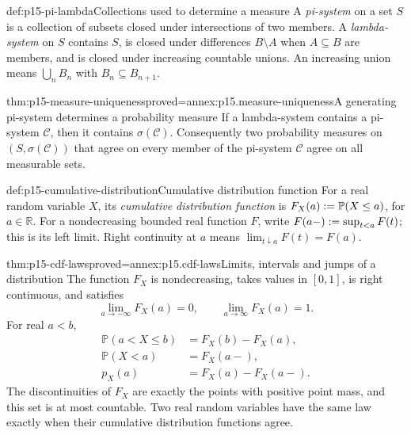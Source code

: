 \begin{hbdefinition}{def:p15-pi-lambda}{Collections used to determine a measure}
A \emph{pi-system} on a set \(S\) is a collection of subsets closed
under intersections of two members. A \emph{lambda-system} on \(S\)
contains \(S\), is closed under differences \(B\setminus A\) when
\(A\subseteq B\) are members, and is closed under increasing countable
unions. An increasing union means \(\bigcup_n B_n\) with
\(B_n\subseteq B_{n+1}\).
\end{hbdefinition}

\begin{hbtheorem}{thm:p15-measure-uniqueness}{proved=annex:p15.measure-uniqueness}{A generating pi-system determines a probability measure}
If a lambda-system contains a pi-system \(\mathcal C\), then it
contains \(\sigma(\mathcal C)\). Consequently two probability
measures on \((S,\sigma(\mathcal C))\) that agree on every member
of the pi-system \(\mathcal C\) agree on all measurable sets.
\end{hbtheorem}

\begin{hbdefinition}{def:p15-cumulative-distribution}{Cumulative distribution function}
For a real random variable \(X\), its \emph{cumulative distribution
function} is
\(F_X(a)\mathrel{:=}\mathbb P(X\leq a)\), for \(a\in\mathbb R\).
For a nondecreasing bounded real function \(F\), write
\(F(a-)\mathrel{:=}\sup_{t<a}F(t)\); this is its left limit.
Right continuity at \(a\) means \(\lim_{t\downarrow a}F(t)=F(a)\).
\end{hbdefinition}

\begin{hbtheorem}{thm:p15-cdf-laws}{proved=annex:p15.cdf-laws}{Limits, intervals and jumps of a distribution}
The function \(F_X\) is nondecreasing, takes values in \([0,1]\),
is right continuous, and satisfies
\[
 \lim_{a\to-\infty}F_X(a)=0,\qquad
 \lim_{a\to\infty}F_X(a)=1.
\]
For real \(a<b\),
\[
\begin{aligned}
 \mathbb P(a<X\leq b)&=F_X(b)-F_X(a),\\
 \mathbb P(X<a)&=F_X(a-),\\
 p_X(a)&=F_X(a)-F_X(a-).
\end{aligned}
\]
The discontinuities of \(F_X\) are exactly the points with positive
point mass, and this set is at most countable. Two real random variables
have the same law exactly when their cumulative distribution functions agree.
\end{hbtheorem}

